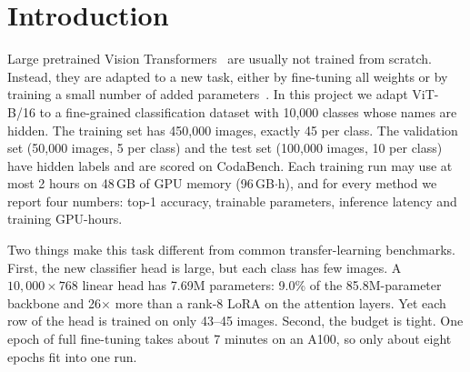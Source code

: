 \section{Introduction}
\label{sec:intro}

Large pretrained Vision Transformers~\cite{dosovitskiy2021vit,steiner2022augreg} are usually not trained from scratch.
Instead, they are adapted to a new task, either by fine-tuning all weights or by training a small number of added parameters~\cite{houlsby2019adapter,hu2022lora,chen2022adaptformer}.
In this project we adapt ViT-B/16 to a fine-grained classification dataset with 10,000 classes whose names are hidden.
The training set has 450,000 images, exactly 45 per class.
The validation set (50,000 images, 5 per class) and the test set (100,000 images, 10 per class) have hidden labels and are scored on CodaBench.
Each training run may use at most 2 hours on 48\,GB of GPU memory (96\,GB$\cdot$h), and for every method we report four numbers: top-1 accuracy, trainable parameters, inference latency and training GPU-hours.

Two things make this task different from common transfer-learning benchmarks.
First, the new classifier head is large, but each class has few images.
A $10{,}000 \times 768$ linear head has 7.69M parameters: 9.0\% of the 85.8M-parameter backbone and 26$\times$ more than a rank-8 LoRA on the attention layers.
Yet each row of the head is trained on only 43--45 images.
Second, the budget is tight.
One epoch of full fine-tuning takes about 7 minutes on an A100, so only about eight epochs fit into one run.

